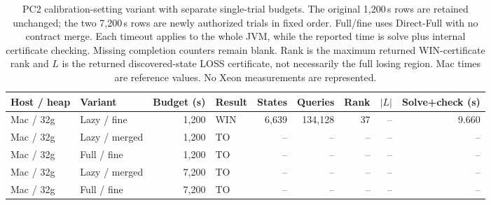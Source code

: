 \begin{table}[ht]
\centering
\small
\begin{tabular}{llrlrrrrr}
\toprule
Host / heap & Variant & Budget (s) & Result & States & Queries & Rank & $|L|$ & Solve+check (s) \\
\midrule
Mac / 32g & Lazy / fine & 1,200 & WIN & 6,639 & 134,128 & 37 & -- & 9.660 \\
Mac / 32g & Lazy / merged & 1,200 & TO & -- & -- & -- & -- & -- \\
Mac / 32g & Full / fine & 1,200 & TO & -- & -- & -- & -- & -- \\
Mac / 32g & Lazy / merged & 7,200 & TO & -- & -- & -- & -- & -- \\
Mac / 32g & Full / fine & 7,200 & TO & -- & -- & -- & -- & -- \\
\bottomrule
\end{tabular}
\caption{PC2 calibration-setting variant with separate single-trial budgets. The original 1,200\,s rows are retained unchanged; the two 7,200\,s rows are newly authorized trials in fixed order. Full/fine uses Direct-Full with no contract merge. Each timeout applies to the whole JVM, while the reported time is solve plus internal certificate checking. Missing completion counters remain blank. Rank is the maximum returned WIN-certificate rank and $L$ is the returned discovered-state LOSS certificate, not necessarily the full losing region. Mac times are reference values. No Xeon measurements are represented.}
\label{tab:pc2-extended-budget}
\end{table}
